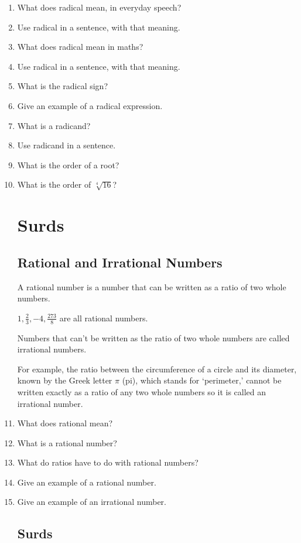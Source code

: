 \documentclass{article}
\begin{document}
\begin{enumerate}

\item What does radical mean, in everyday speech?
\item Use radical in a sentence, with that meaning.
\item What does radical mean in maths?
\item Use radical in a sentence, with that meaning.
\item What is the radical sign?
\item Give an example of a radical expression.
\item What is a radicand?
\item Use radicand in a sentence.
\item What is the order of a root?
\item What is the order of $\sqrt[4]{16}$?

\section*{Surds}

\subsection*{Rational and Irrational Numbers}

A rational number is a number that can be written as a ratio of two whole numbers.

$1, \frac{2}{3}, -4, \frac{273}{8}$ are all rational numbers.

Numbers that can’t be written as the ratio of two whole numbers are called irrational numbers.

For example, the ratio between the circumference of a circle and its diameter, known by the Greek letter $\pi$ (pi), which stands for ‘perimeter,’ cannot be written exactly as a ratio of any two whole numbers so it is called an irrational number.

\item What does rational mean?
\item What is a rational number?
\item What do ratios have to do with rational numbers?
\item Give an example of a rational number.
\item Give an example of an irrational number.

\subsection*{Surds}


\end{enumerate}
\end{document}

